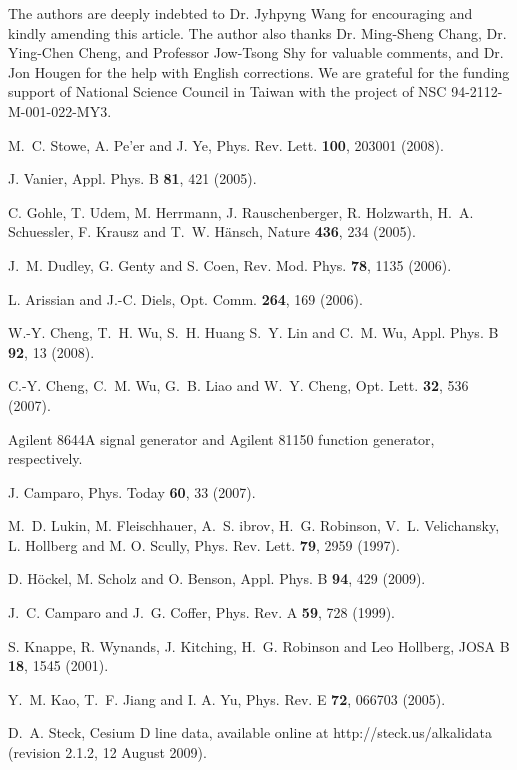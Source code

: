 \documentclass[%
aps,
prl,
showpacs,
twocolumn,
]{revtex4}
\begin{document}
The authors are deeply indebted to Dr. Jyhpyng Wang for encouraging and kindly 
amending this article.  The author also thanks Dr. Ming-Sheng Chang, Dr. Ying-Chen Cheng, 
and Professor Jow-Tsong Shy for valuable comments, and Dr. Jon Hougen for the help 
with English corrections. We are grateful for the funding support of National 
Science Council in Taiwan with the project of NSC 94-2112-M-001-022-MY3.



\begin{thebibliography}{99}

 M.~C. Stowe, A. Pe'er and J. Ye, Phys. Rev. Lett. {\bf 100}, 203001 (2008).

 J. Vanier, Appl. Phys. B {\bf 81}, 421 (2005).

 C. Gohle, T. Udem, M. Herrmann, J. Rauschenberger, R. Holzwarth, H.~A. Schuessler, F. Krausz and T.~W. H\"{a}nsch, Nature {\bf 436}, 234 (2005).

 J.~M. Dudley, G. Genty and S. Coen, Rev. Mod. Phys. {\bf 78}, 1135 (2006).

 L. Arissian and J.-C. Diels, Opt. Comm. {\bf 264}, 169 (2006).

 W.-Y. Cheng, T.~H. Wu, S.~H. Huang S.~Y. Lin and C.~M. Wu, Appl. Phys. B {\bf 92}, 13 (2008).

 C.-Y. Cheng, C.~M. Wu, G.~B. Liao and W.~Y. Cheng, Opt. Lett. {\bf 32}, 536 (2007).

 Agilent 8644A signal generator and Agilent 81150 function generator, respectively.

 J. Camparo, Phys. Today {\bf 60}, 33 (2007).

 M.~D. Lukin, M. Fleischhauer, A.~S. ibrov, H.~G. Robinson, V.~L. Velichansky, L. Hollberg and M. O. Scully, Phys. Rev. Lett. {\bf 79}, 2959 (1997).

 D. H\"{o}ckel, M. Scholz and O. Benson, Appl. Phys. B {\bf 94}, 429 (2009).

 J.~C. Camparo and J.~G. Coffer, Phys. Rev. A {\bf 59}, 728 (1999).

 S. Knappe, R. Wynands, J. Kitching, H.~G. Robinson and Leo Hollberg, JOSA B {\bf 18}, 1545 (2001).

 Y.~M. Kao, T.~F. Jiang and I. A. Yu, Phys. Rev. E {\bf 72}, 066703 (2005).

 D.~A. Steck, Cesium D line data, available online at http://steck.us/alkalidata (revision 2.1.2, 12 August 2009).

\end{thebibliography}
\end{document}
